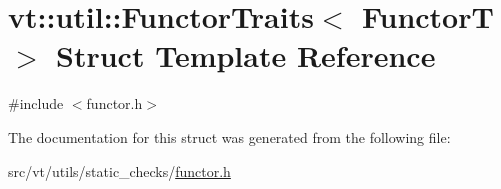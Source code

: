 \hypertarget{structvt_1_1util_1_1_functor_traits}{}\section{vt\+:\+:util\+:\+:Functor\+Traits$<$ FunctorT $>$ Struct Template Reference}
\label{structvt_1_1util_1_1_functor_traits}


{\ttfamily \#include $<$functor.\+h$>$}



The documentation for this struct was generated from the following file\+:\begin{DoxyCompactItemize}
\item 
src/vt/utils/static\+\_\+checks/\hyperlink{functor_8h}{functor.\+h}\end{DoxyCompactItemize}

